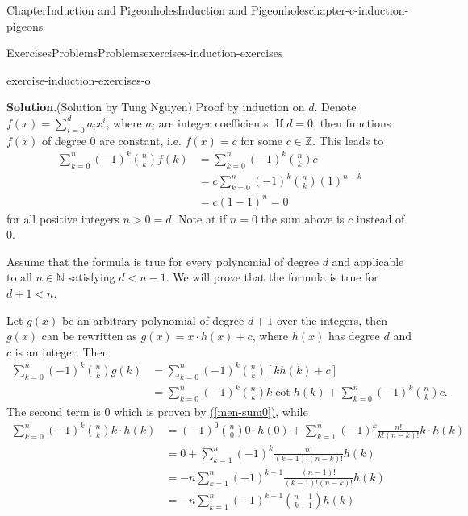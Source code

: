 \documentclass[oneside,10pt,]{book}
\newcommand{\blocktitlefont}{\relax}
\newcommand{\xreffont}{\relax}
\numberwithin{equation}{section}
\newcommand{\lt}{<}
\newcommand{\gt}{>}
\begin{document}
\begin{chapterptx}{Chapter}{Induction and Pigeonholes}{}{Induction and Pigeonholes}{}{}{chapter-c-induction-pigeons}
\begin{exercises-section}{Exercises}{Problems}{}{Problems}{}{}{exercises-induction-exercises}
\begin{divisionexercise}{14}{}{}{exercise-induction-exercises-o}
\par\smallskip%
\noindent\textbf{\blocktitlefont Solution}.\hypertarget{solution-induction-exercises-o-b}{}\quad{}(Solution by Tung Nguyen) Proof by induction on \(d\). Denote \(f(x) = \sum_{i = 0}^{d} a_i x^i\), where \(a_i\) are integer coefficients.  If \(d=0\), then functions \(f(x)\) of degree 0 are constant, i.e. \(f(x) = c\) for some \(c \in \mathbb{Z}\). This leads to%
\begin{equation}
\begin{split}
\sum_{k=0}^{n} (-1)^k\binom{n}{k}f(k) & = \sum_{k=0}^{n} (-1)^k\binom{n}{k}c\\
& = c\sum_{k=0}^{n} (-1)^k\binom{n}{k}(1)^{n-k} \\
& = c(1 - 1)^n = 0
\end{split}\label{men-sum0}
\end{equation}
for all positive integers \(n \gt 0 = d\). Note at if \(n = 0\) the sum above is \(c\) instead of \(0\).%
\par
Assume that the formula is true for every polynomial of degree \(d\) and applicable to all \(n \in \mathbb{N}\) satisfying \(d \lt n - 1\). We will prove that the formula is true for \(d + 1 \lt n\).%
\par
Let \(g(x)\) be an arbitrary polynomial of degree \(d+1\) over the integers, then \(g(x)\) can be rewritten as \(g(x) = x\cdot h(x) + c\), where \(h(x)\) has degree \(d\) and \(c\) is an integer. Then%
\begin{equation}
\begin{split}
\sum_{k=0}^{n} (-1)^k\binom{n}{k}g(k) &= \sum_{k=0}^{n} (-1)^k\binom{n}{k}\left[kh(k) + c\right]\\
& = \sum_{k=0}^{n} (-1)^k\binom{n}{k}k \cot h(k) + \sum_{k=0}^{n} (-1)^k\binom{n}{k}c.
\end{split}\label{men-sum1}
\end{equation}
The second term is 0 which is proven by \hyperref[men-sum0]{({\xreffont\ref{men-sum0}})}, while%
\begin{equation}
\begin{split}
\sum_{k=0}^{n} (-1)^k\binom{n}{k}k\cdot h(k) 
&= (-1)^0\binom{n}{0}0\cdot h(0) + \sum_{k=1}^{n} (-1)^k\frac{n!}{k!(n-k)!}k\cdot h(k)\\
& = 0 + \sum_{k=1}^{n} (-1)^k\frac{n!}{(k-1)!(n-k)!}h(k)\\
& = -n\sum_{k=1}^{n} (-1)^{k-1}\frac{(n-1)!}{(k-1)!(n-k)!}h(k) \\ 
&= -n\sum_{k=1}^{n} (-1)^{k-1}\binom{n-1}{k-1}h(k)\\

\end{split}
\end{equation}
\end{divisionexercise}
\end{exercises-section}
\end{chapterptx}
\end{document}
